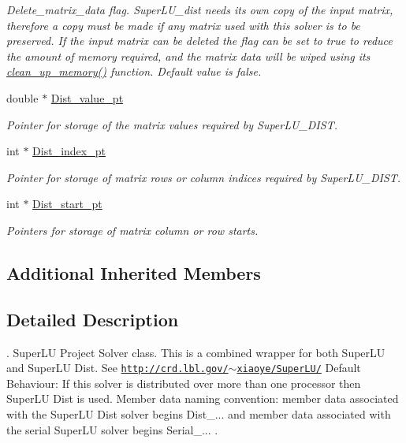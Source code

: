 \begin{DoxyCompactItemize}
\begin{DoxyCompactList}\small\item\em Delete\+\_\+matrix\+\_\+data flag. Super\+L\+U\+\_\+dist needs its own copy of the input matrix, therefore a copy must be made if any matrix used with this solver is to be preserved. If the input matrix can be deleted the flag can be set to true to reduce the amount of memory required, and the matrix data will be wiped using its \hyperlink{classoomph_1_1SuperLUSolver_aec78b96a8f831a89f9b8fb48b1ce0c68}{clean\+\_\+up\+\_\+memory()} function. Default value is false. \end{DoxyCompactList}\item 
double $\ast$ \hyperlink{classoomph_1_1SuperLUSolver_a4aa2df1c91537adb245395aff054b591}{Dist\+\_\+value\+\_\+pt}
\begin{DoxyCompactList}\small\item\em Pointer for storage of the matrix values required by Super\+L\+U\+\_\+\+D\+I\+ST. \end{DoxyCompactList}\item 
int $\ast$ \hyperlink{classoomph_1_1SuperLUSolver_a1c7efdc631fad57eaa4d96a4d927a23f}{Dist\+\_\+index\+\_\+pt}
\begin{DoxyCompactList}\small\item\em Pointer for storage of matrix rows or column indices required by Super\+L\+U\+\_\+\+D\+I\+ST. \end{DoxyCompactList}\item 
int $\ast$ \hyperlink{classoomph_1_1SuperLUSolver_a7b5c61ed28e441622bfe3f623dee28b7}{Dist\+\_\+start\+\_\+pt}
\begin{DoxyCompactList}\small\item\em Pointers for storage of matrix column or row starts. \end{DoxyCompactList}\end{DoxyCompactItemize}
\subsection*{Additional Inherited Members}


\subsection{Detailed Description}
. Super\+LU Project Solver class. This is a combined wrapper for both Super\+LU and Super\+LU Dist. See \href{http://crd.lbl.gov/~xiaoye/SuperLU/}{\tt http\+://crd.\+lbl.\+gov/$\sim$xiaoye/\+Super\+L\+U/} Default Behaviour\+: If this solver is distributed over more than one processor then Super\+LU Dist is used. Member data naming convention\+: member data associated with the Super\+LU Dist solver begins Dist\+\_\+... and member data associated with the serial Super\+LU solver begins Serial\+\_\+... . 

